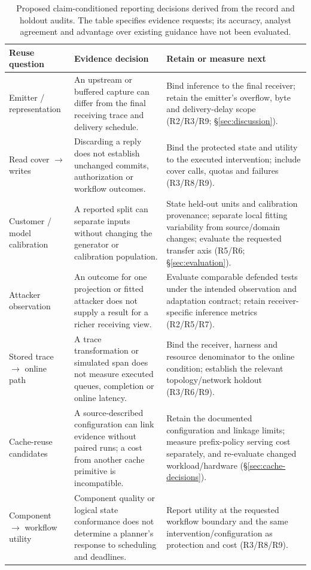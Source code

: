 \begin{table}[t]\centering\footnotesize
\caption{Proposed claim-conditioned reporting decisions derived from the record and holdout audits. The table specifies evidence requests; its accuracy, analyst agreement and advantage over existing guidance have not been evaluated.}\label{tab:r19-decisions}
\begin{tabularx}{\textwidth}{@{}p{}p{}Y@{}}\toprule
Reuse question & Evidence decision & Retain or measure next\\\midrule
Emitter / representation & An upstream or buffered capture can differ from the final receiving trace and delivery schedule. & Bind inference to the final receiver; retain the emitter's overflow, byte and delivery-delay scope (R2/R3/R9; \S\ref{sec:discussion}).\\
Read cover $\rightarrow$ writes & Discarding a reply does not establish unchanged commits, authorization or workflow outcomes. & Bind the protected state and utility to the executed intervention; include cover calls, quotas and failures (R3/R8/R9).\\
Customer / model calibration & A reported split can separate inputs without changing the generator or calibration population. & State held-out units and calibration provenance; separate local fitting variability from source/domain changes; evaluate the requested transfer axis (R5/R6; \S\ref{sec:evaluation}).\\
Attacker observation & An outcome for one projection or fitted attacker does not supply a result for a richer receiving view. & Evaluate comparable defended tests under the intended observation and adaptation contract; retain receiver-specific inference metrics (R2/R5/R7).\\
Stored trace $\rightarrow$ online path & A trace transformation or simulated span does not measure executed queues, completion or online latency. & Bind the receiver, harness and resource denominator to the online condition; establish the relevant topology/network holdout (R3/R6/R9).\\
Cache-reuse candidates & A source-described configuration can link evidence without paired runs; a cost from another cache primitive is incompatible. & Retain the documented configuration and linkage limits; measure prefix-policy serving cost separately, and re-evaluate changed workload/hardware (\S\ref{sec:cache-decisions}).\\
Component $\rightarrow$ workflow utility & Component quality or logical state conformance does not determine a planner's response to scheduling and deadlines. & Report utility at the requested workflow boundary and the same intervention/configuration as protection and cost (R3/R8/R9).\\\bottomrule
\end{tabularx}\end{table}
